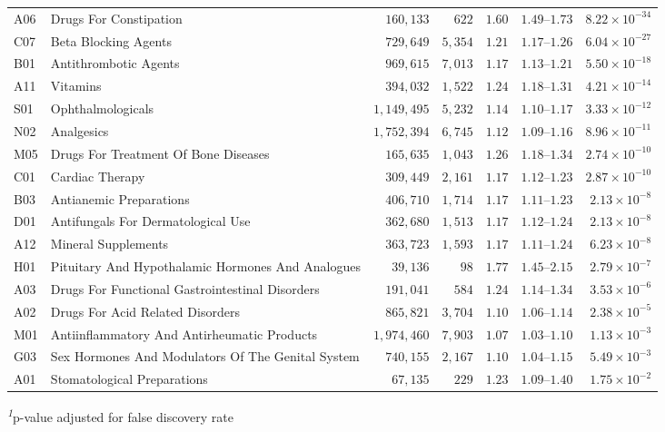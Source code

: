 \begin{longtable}{llrrrrr}
A06 & Drugs For Constipation & $160,133$ & $622$ & $1.60$ & $1.49$–$1.73$ & $8.22 \times 10^{-34}$ \\ 
C07 & Beta Blocking Agents & $729,649$ & $5,354$ & $1.21$ & $1.17$–$1.26$ & $6.04 \times 10^{-27}$ \\ 
B01 & Antithrombotic Agents & $969,615$ & $7,013$ & $1.17$ & $1.13$–$1.21$ & $5.50 \times 10^{-18}$ \\ 
A11 & Vitamins & $394,032$ & $1,522$ & $1.24$ & $1.18$–$1.31$ & $4.21 \times 10^{-14}$ \\ 
S01 & Ophthalmologicals & $1,149,495$ & $5,232$ & $1.14$ & $1.10$–$1.17$ & $3.33 \times 10^{-12}$ \\ 
N02 & Analgesics & $1,752,394$ & $6,745$ & $1.12$ & $1.09$–$1.16$ & $8.96 \times 10^{-11}$ \\ 
M05 & Drugs For Treatment Of Bone Diseases & $165,635$ & $1,043$ & $1.26$ & $1.18$–$1.34$ & $2.74 \times 10^{-10}$ \\ 
C01 & Cardiac Therapy & $309,449$ & $2,161$ & $1.17$ & $1.12$–$1.23$ & $2.87 \times 10^{-10}$ \\ 
B03 & Antianemic Preparations & $406,710$ & $1,714$ & $1.17$ & $1.11$–$1.23$ & $2.13 \times 10^{-8}$ \\ 
D01 & Antifungals For Dermatological Use & $362,680$ & $1,513$ & $1.17$ & $1.12$–$1.24$ & $2.13 \times 10^{-8}$ \\ 
A12 & Mineral Supplements & $363,723$ & $1,593$ & $1.17$ & $1.11$–$1.24$ & $6.23 \times 10^{-8}$ \\ 
H01 & Pituitary And Hypothalamic Hormones And Analogues & $39,136$ & $98$ & $1.77$ & $1.45$–$2.15$ & $2.79 \times 10^{-7}$ \\ 
A03 & Drugs For Functional Gastrointestinal Disorders & $191,041$ & $584$ & $1.24$ & $1.14$–$1.34$ & $3.53 \times 10^{-6}$ \\ 
A02 & Drugs For Acid Related Disorders & $865,821$ & $3,704$ & $1.10$ & $1.06$–$1.14$ & $2.38 \times 10^{-5}$ \\ 
M01 & Antiinflammatory And Antirheumatic Products & $1,974,460$ & $7,903$ & $1.07$ & $1.03$–$1.10$ & $1.13 \times 10^{-3}$ \\ 
G03 & Sex Hormones And Modulators Of The Genital System & $740,155$ & $2,167$ & $1.10$ & $1.04$–$1.15$ & $5.49 \times 10^{-3}$ \\ 
A01 & Stomatological Preparations & $67,135$ & $229$ & $1.23$ & $1.09$–$1.40$ & $1.75 \times 10^{-2}$ \\ 
\bottomrule
\end{longtable}
\begin{minipage}{\linewidth}
\textsuperscript{\textit{1}}p-value adjusted for false discovery rate\\
\end{minipage}

